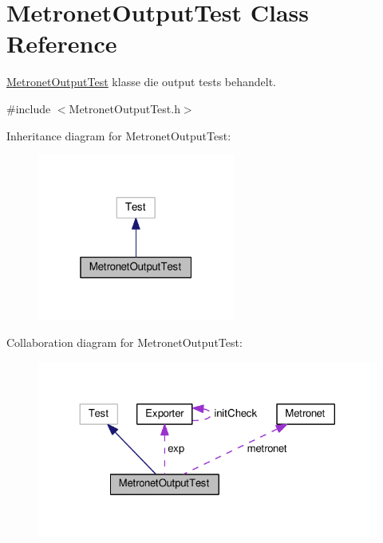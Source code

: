 \hypertarget{class_metronet_output_test}{}\section{Metronet\+Output\+Test Class Reference}
\label{class_metronet_output_test}


\hyperlink{class_metronet_output_test}{Metronet\+Output\+Test} klasse die output tests behandelt.  




{\ttfamily \#include $<$Metronet\+Output\+Test.\+h$>$}



Inheritance diagram for Metronet\+Output\+Test\+:\nopagebreak
\begin{figure}[H]
\begin{center}
\leavevmode
\includegraphics[width=184pt]{class_metronet_output_test__inherit__graph}
\end{center}
\end{figure}


Collaboration diagram for Metronet\+Output\+Test\+:
\nopagebreak
\begin{figure}[H]
\begin{center}
\leavevmode
\includegraphics[width=324pt]{class_metronet_output_test__coll__graph}
\end{center}
\end{figure}
